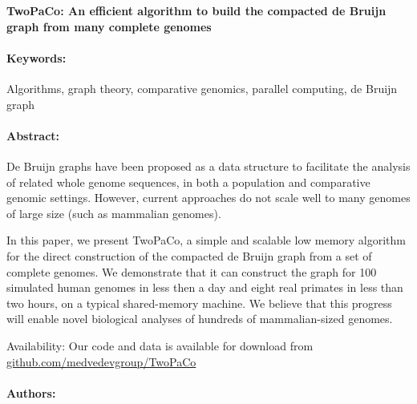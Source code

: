 \noindent
\large {\bf TwoPaCo: An efficient algorithm to build the compacted de Bruijn graph from many complete genomes} 


\normalsize 


\noindent \paragraph{Keywords:} 
Algorithms, graph theory, comparative genomics, parallel computing, de Bruijn graph

\noindent \paragraph{Abstract:} 

De Bruijn graphs have been proposed as a data structure to facilitate the analysis of related
whole genome sequences, in both a population and comparative genomic settings. However, current
approaches do not scale well to many genomes of large size (such as mammalian genomes).

In this paper, we present TwoPaCo, a simple and scalable low memory algorithm for the direct
construction of the compacted de Bruijn graph from a set of complete genomes. We demonstrate that it
can construct the graph for 100 simulated human genomes in less then a day and eight real primates in
less than two hours, on a typical shared-memory machine. We believe that this progress will enable novel
biological analyses of hundreds of mammalian-sized genomes.

Availability: Our code and data is available for download from \url{github.com/medvedevgroup/TwoPaCo}

\noindent \paragraph{Authors:} 

\noindent \paragraph{} 
{
\centering
{}
}

